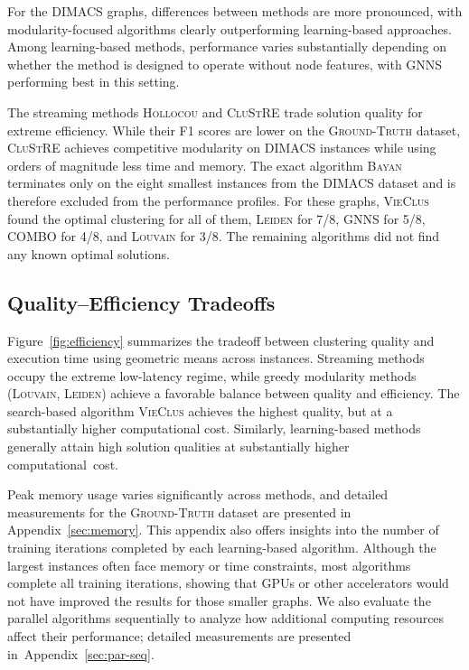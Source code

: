 \documentclass[../paper.tex]{subfiles}
\begin{document}
For the \textsc{DIMACS} graphs, differences between methods are more pronounced, with modularity-focused algorithms clearly outperforming learning-based approaches. Among learning-based methods, performance varies substantially depending on whether the method is designed to operate without node features, with \textsc{GNNS} performing best in this setting.

The streaming methods \textsc{Hollocou} and \textsc{CluStRE} trade solution quality for extreme efficiency. While their F1 scores are lower on the \textsc{Ground-Truth} dataset, \textsc{CluStRE} achieves competitive modularity on DIMACS instances while using orders of magnitude less time and memory. The exact algorithm \textsc{Bayan} terminates only on the eight smallest instances from the \textsc{DIMACS} dataset and is therefore excluded from the performance profiles. For these graphs, \textsc{VieClus} found the optimal clustering for all of them, \textsc{Leiden} for 7/8, \textsc{GNNS} for 5/8, \textsc{COMBO} for 4/8, and \textsc{Louvain} for 3/8. The remaining algorithms did not find any known optimal solutions.





\subsection{Quality--Efficiency Tradeoffs}

Figure~\ref{fig:efficiency} summarizes the tradeoff between clustering quality and execution time using geometric means across instances. Streaming methods occupy the extreme low-latency regime, while greedy modularity methods (\textsc{Louvain}, \textsc{Leiden}) achieve a favorable balance between quality and efficiency. The search-based algorithm \textsc{VieClus} achieves the highest quality, but at a substantially higher computational cost. Similarly, learning-based methods generally attain high solution qualities at substantially higher \hbox{computational cost.}

Peak memory usage varies significantly across methods, and detailed measurements for the \textsc{Ground-Truth} dataset are presented in Appendix~\ref{sec:memory}. This appendix also offers insights into the number of training iterations completed by each learning-based algorithm. Although the largest instances often face memory or time constraints, most algorithms complete all training iterations, showing that GPUs or other accelerators would not have improved the results for those smaller graphs. We also evaluate the parallel algorithms sequentially to analyze how additional computing resources affect their performance; detailed measurements are presented \hbox{in Appendix~\ref{sec:par-seq}.}
\end{document}

